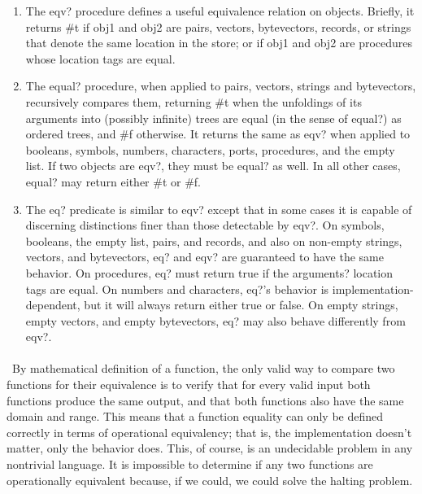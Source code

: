 \documentclass{article}
\begin{document}
	\begin{enumerate}[label=-]
				
		\item The eqv? procedure defines a useful equivalence relation on objects. Briefly, it returns \#t if obj1 and obj2 are pairs, vectors, bytevectors, records, or strings that denote the same location in the store; or if obj1 and obj2 are procedures whose location tags are equal.
					
		\item The equal? procedure, when applied to pairs, vectors, strings and bytevectors, recursively compares them, returning \#t when the unfoldings of its arguments into (possibly infinite) trees are equal (in the sense of equal?) as ordered trees, and \#f otherwise. It returns the same as eqv? when applied to booleans, symbols, numbers, characters, ports, procedures, and the empty list. If two objects are eqv?, they must be equal? as well. In all other cases, equal? may return either \#t or \#f.
					
		\item The eq? predicate is similar to eqv? except that in some cases it is capable of discerning distinctions finer than those detectable by eqv?. On symbols, booleans, the empty list, pairs, and records, and also on non-empty strings, vectors, and bytevectors, eq? and eqv? are guaranteed to have the same behavior. On procedures, eq? must return true if the arguments? location tags are equal. On numbers and characters, eq?'s behavior is implementation-dependent, but it will always return either true or false. On empty strings, empty vectors, and empty bytevectors, eq? may also behave differently from eqv?.
					
	\end{enumerate}
	
\paragraph{}\
By mathematical definition of a function, the only valid way to compare two functions for their equivalence is to verify that for every valid input both functions produce the same output, and that both functions also have the same domain and range. This means that a function equality can only be defined correctly in terms of operational equivalency; that is, the implementation doesn't matter, only the behavior does. This, of course, is an undecidable problem in any nontrivial language. It is impossible to determine if any two functions are operationally equivalent because, if we could, we could solve the halting problem. 
\end{document}
